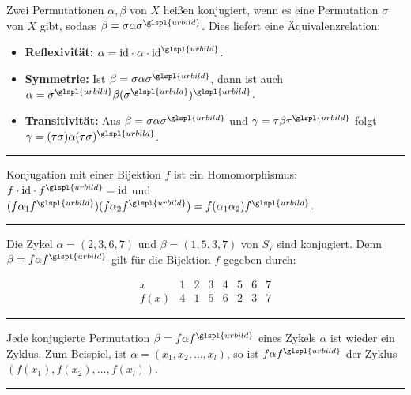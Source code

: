 \documentclass[9pt]{article}
\begin{document}
\begin{defi}
Zwei Permutationen $\alpha, \beta$ von $X$ heißen konjugiert, wenn es eine Permutation $\sigma$ von $X$ gibt, sodass $\beta = \sigma \alpha \sigma^{\glspl{urbild}}$.  
Dies liefert eine Äquivalenzrelation:
\begin{itemize}
    \item \textbf{Reflexivität:} $\alpha = \mathrm{id} \cdot \alpha \cdot \mathrm{id}^{\glspl{urbild}}$.
    \item \textbf{Symmetrie:} Ist $\beta = \sigma \alpha \sigma^{\glspl{urbild}}$, dann ist auch $\alpha = \sigma^{\glspl{urbild}} \beta (\sigma^{\glspl{urbild}})^{\glspl{urbild}}$.
    \item \textbf{Transitivität:} Aus $\beta = \sigma \alpha \sigma^{\glspl{urbild}}$ und $\gamma = \tau \beta \tau^{\glspl{urbild}}$ folgt $\gamma = (\tau \sigma) \alpha (\tau \sigma)^{\glspl{urbild}}$.
\end{itemize}
\end{defi} \noindent \rule{8cm}{0.4pt}

\begin{bem}
Konjugation mit einer Bijektion $f$ ist ein \gls{Homomorphismus}:   
$f \cdot \mathrm{id} \cdot f^{\glspl{urbild}} = \mathrm{id}$ und $(f \alpha_1 f^{\glspl{urbild}})(f \alpha_2 f^{\glspl{urbild}}) = f (\alpha_1 \alpha_2) f^{\glspl{urbild}}$. 
\end{bem} \noindent \rule{8cm}{0.4pt}

\begin{bsp}
Die Zykel $\alpha = (2, 3, 6, 7)$ und $\beta = (1, 5, 3, 7)$ von $S_7$ sind konjugiert. Denn $\beta = f \alpha f^{\glspl{urbild}}$ gilt für die Bijektion $f$ gegeben durch:

\[
\begin{array}{c|ccccccc}
x & 1 & 2 & 3 & 4 & 5 & 6 & 7 \\
\hline
f(x) & 4 & 1 & 5 & 6 & 2 & 3 & 7
\end{array}
\]
\end{bsp} \noindent \rule{8cm}{0.4pt}

\begin{bem}
Jede konjugierte Permutation $\beta = f \alpha f^{\glspl{urbild}}$ eines Zykels $\alpha$ ist wieder ein Zyklus. Zum Beispiel, ist $\alpha = (x_1, x_2, \dots, x_l)$, so ist $f \alpha f^{\glspl{urbild}}$ der Zyklus $(f(x_1), f(x_2), \dots, f(x_l))$. \\
\end{bem} \noindent \rule{8cm}{0.4pt}
\end{document}
